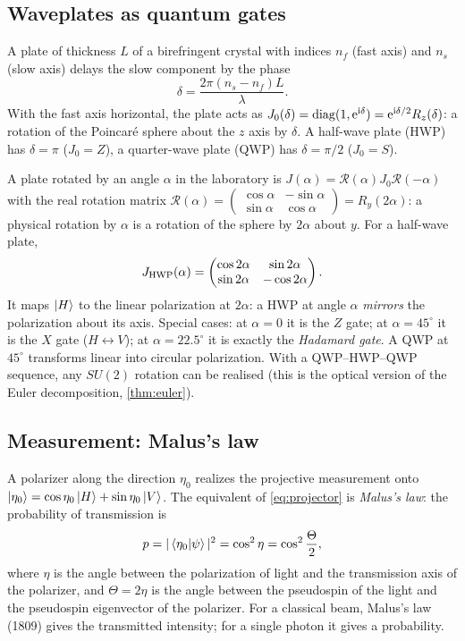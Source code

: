 \subsection{Waveplates as quantum gates}
A plate of thickness $L$ of a birefringent crystal with indices $n_f$ (fast axis) and $n_s$ (slow axis) delays the slow component by the phase
\begin{equation}
  \delta=\frac{2\pi(n_s-n_f)L}{\lambda}.
\end{equation}
With the fast axis horizontal, the plate acts as $J_0(\delta)=\operatorname{diag}(1,\mathrm e^{\mathrm i\delta})=\mathrm e^{\mathrm i\delta/2}R_z(\delta)$: a rotation of the Poincaré
sphere about the $z$ axis by $\delta$. A half-wave plate (HWP) has $\delta=\pi$ ($J_0=Z$), a quarter-wave plate (QWP) has $\delta=\pi/2$ ($J_0=S$).

A plate rotated by an angle $\alpha$ in the laboratory is $J(\alpha)=\mathcal R(\alpha)J_0\mathcal R(-\alpha)$ with the real rotation matrix
$\mathcal R(\alpha)=\begin{pmatrix}\cos\alpha&-\sin\alpha\\ \sin\alpha&\cos\alpha\end{pmatrix}=R_y(2\alpha)$: a physical rotation by $\alpha$ is a rotation of the
sphere by $2\alpha$ about $y$. For a half-wave plate,
\begin{equation}
  J_{\rm HWP}(\alpha)=\begin{pmatrix}\cos2\alpha&\sin2\alpha\\ \sin2\alpha&-\cos2\alpha\end{pmatrix}.
\end{equation}
It maps $\left|H\right\rangle$ to the linear polarization at $2\alpha$: a HWP at angle $\alpha$ \emph{mirrors} the polarization about its axis. Special cases:
at $\alpha=0$ it is the $Z$ gate; at $\alpha=45^\circ$ it is the $X$ gate ($H\leftrightarrow V$); at $\alpha=22.5^\circ$ it is exactly the
\emph{Hadamard gate}. A QWP at $45^\circ$ transforms linear into circular polarization. With a QWP--HWP--QWP sequence, any $SU(2)$ rotation
can be realised (this is the optical version of the Euler decomposition, \cref{thm:euler}).

\subsection{Measurement: Malus's law}
A polarizer along the direction $\eta_0$ realizes the projective measurement onto $\left|\eta_0\right\rangle=\cos\eta_0\left|H\right\rangle+\sin\eta_0\left|V\right\rangle$. The
equivalent of \cref{eq:projector} is \emph{Malus's law}: the probability of transmission is
\begin{equation}
  p=|\left\langle\eta_0\middle|\psi\right\rangle|^2=\cos^2\eta=\cos^2\frac\Theta2,
\end{equation}
where $\eta$ is the angle between the polarization of light and the transmission axis of the polarizer, and $\Theta=2\eta$ is the angle between
the pseudospin of the light and the pseudospin eigenvector of the polarizer. For a classical beam, Malus's law (1809) gives the transmitted
intensity; for a single photon it gives a probability.

